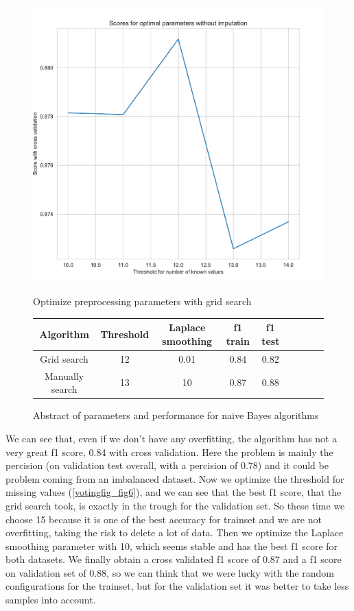 \documentclass[11pt]{article}
\begin{document}
\begin{figure}
\begin{minipage}[t]{0.3\textwidth}
\includegraphics[width=1\linewidth]{voting/threshold_grid_nb0.pdf}
\caption{Optimize preprocessing parameters with grid search}
\label{votingfig_fig5}
\end{minipage}
\begin{minipage}[t]{0.7\textwidth}
\centering
  \begin{tabular}{ | c | c | c | c | c | c | c | c | c |}
	\hline
    Algorithm & Threshold & Laplace smoothing & f1 train & f1 test \\    
    \hline
    Grid search & 12 & 0.01 & 0.84 & 0.82 \\ \hline
    Manually search & 13 & 10 & 0.87 & 0.88\\
    \hline
    \end{tabular}
    \caption{Abstract of parameters and performance for naive Bayes algorithms}
    \label{tab_voting2}
\end{minipage}
\end{figure}

We can see that, even if we don't have any overfitting, the algorithm has not a very great f1 score, 0.84 with cross validation. Here the problem is mainly the percision (on validation test overall, with a percision of 0.78) and it could be problem coming from an imbalanced dataset.
Now we optimize the threshold for missing values (\ref{votingfig_fig6}), and we can see that the best f1 score, that the grid search took, is exactly in the trough for the validation set. So these time we choose 15 because it is one of the best accuracy for trainset and we are not overfitting, taking the risk to delete a lot of data. Then we optimize the Laplace smoothing parameter with 10, which seems stable and has the best f1 score for both datasets.
We finally obtain a cross validated f1 score of 0.87 and a f1 score on validation set of 0.88, so we can think that we were lucky with the random configurations for the trainset, but for the validation set it was better to take less samples into account.
\end{document}

